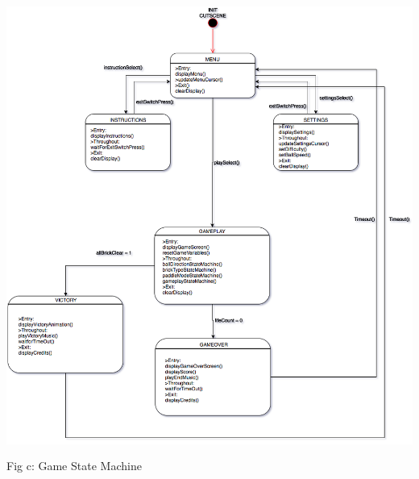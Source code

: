 \documentclass{article}
\begin{document}
\begin{center}
\includegraphics[width=14cm, height=15cm]{gameStateMachine}
\\ {\small Fig c: Game State Machine}
\end{center}
\end{document}
